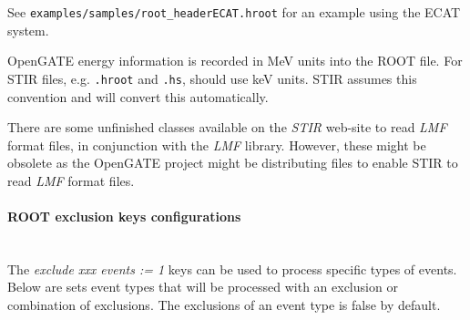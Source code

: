\documentclass{article}
\newcommand{\subsubsubsection}[1]{\paragraph{#1}\mbox{} \\}
\begin{document}
See \texttt{examples/samples/root\_headerECAT.hroot} for an example using the ECAT system.

OpenGATE energy information is recorded in MeV units into the ROOT file.
For STIR files, e.g. \texttt{.hroot} and \texttt{.hs}, should use keV units.
STIR assumes this convention and will convert this automatically.

There are some unfinished classes
available on the \textit{STIR} web-site to read \textit{LMF} format files,
in conjunction with the \textit{LMF} library. However, these might be obsolete
as the OpenGATE project might be distributing files
to enable STIR to read \textit{LMF} format files.

\subsubsubsection{ROOT exclusion keys configurations}
The \textit{exclude xxx events := 1} keys can be used to process specific types of events.
Below are sets event types that will be processed with an exclusion or combination of exclusions.
The exclusions of an event type is false by default.
\end{document}
